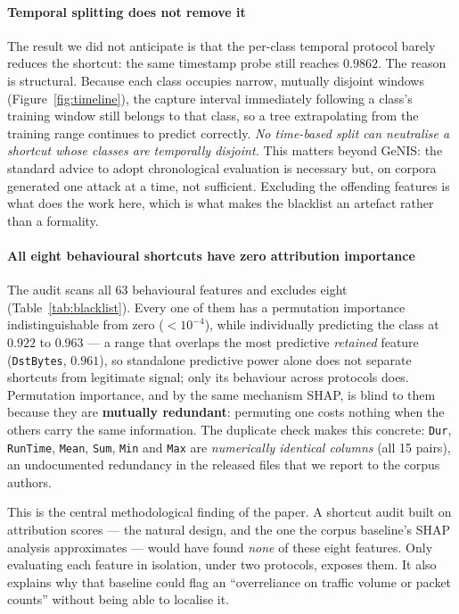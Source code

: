 \documentclass[review,12pt]{elsarticle}
\begin{document}
\paragraph{Temporal splitting does not remove it}
The result we did not anticipate is that the per-class temporal protocol barely reduces
the shortcut: the same timestamp probe still reaches $0.9862$. The reason is structural.
Because each class occupies narrow, mutually disjoint windows
(Figure~\ref{fig:timeline}), the capture interval immediately following a class's
training window still belongs to that class, so a tree extrapolating from the training
range continues to predict correctly. \emph{No time-based split can neutralise a shortcut
whose classes are temporally disjoint.} This matters beyond GeNIS: the standard advice to
adopt chronological evaluation \cite{pendlebury2019tesseract} is necessary but, on
corpora generated one attack at a time, not sufficient. Excluding the offending features
is what does the work here, which is what makes the blacklist an artefact rather than a
formality.

\paragraph{All eight behavioural shortcuts have zero attribution importance}
The audit scans all 63 behavioural features and excludes eight
(Table~\ref{tab:blacklist}). Every one of them has a permutation importance
indistinguishable from zero ($<10^{-4}$), while individually predicting the class at
$0.922$ to $0.963$ --- a range that overlaps the most predictive \emph{retained} feature
(\texttt{DstBytes}, $0.961$), so standalone predictive power alone does not separate
shortcuts from legitimate signal; only its behaviour across protocols does. Permutation
importance, and by the same mechanism SHAP, is blind to them because they are
\textbf{mutually redundant}: permuting one costs nothing when the others carry the same
information. The duplicate check makes this concrete: \texttt{Dur}, \texttt{RunTime},
\texttt{Mean}, \texttt{Sum}, \texttt{Min} and \texttt{Max} are \emph{numerically identical
columns} (all 15 pairs), an undocumented redundancy in the released files that we report
to the corpus authors.

This is the central methodological finding of the paper. A shortcut audit built on
attribution scores --- the natural design, and the one the corpus baseline's SHAP analysis
approximates \cite{silva2025binary} --- would have found \emph{none} of these eight
features. Only evaluating each feature in isolation, under two protocols, exposes them.
It also explains why that baseline could flag an ``overreliance on traffic volume or
packet counts'' without being able to localise it.
\end{document}
